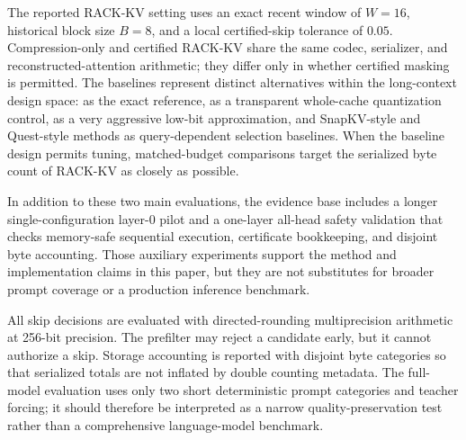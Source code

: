 The reported RACK-KV setting uses an exact recent window of \(W=16\), historical block size \(B=8\), and a local certified-skip tolerance of \(0.05\). Compression-only and certified RACK-KV share the same codec, serializer, and reconstructed-attention arithmetic; they differ only in whether certified masking is permitted. The baselines represent distinct alternatives within the long-context design space: \methodfull{} as the exact reference, \methodint{} as a transparent whole-cache quantization control, \methodkivi{} as a very aggressive low-bit approximation, and SnapKV-style and Quest-style methods as query-dependent selection baselines. When the baseline design permits tuning, matched-budget comparisons target the serialized byte count of RACK-KV as closely as possible.

In addition to these two main evaluations, the evidence base includes a longer single-configuration layer-0 pilot and a one-layer all-head safety validation that checks memory-safe sequential execution, certificate bookkeeping, and disjoint byte accounting. Those auxiliary experiments support the method and implementation claims in this paper, but they are not substitutes for broader prompt coverage or a production inference benchmark.

All skip decisions are evaluated with directed-rounding multiprecision arithmetic at 256-bit precision. The \fp{} prefilter may reject a candidate early, but it cannot authorize a skip. Storage accounting is reported with disjoint byte categories so that serialized totals are not inflated by double counting metadata. The full-model evaluation uses only two short deterministic prompt categories and teacher forcing; it should therefore be interpreted as a narrow quality-preservation test rather than a comprehensive language-model benchmark.
